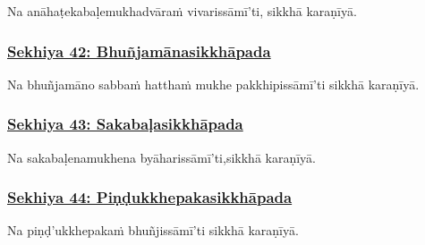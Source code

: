 Na anāhaṭe\makeatletter\hyperlink{endnote494-appendix}\makeatother \thinspace kabaḷe\makeatletter\hyperlink{endnote495-appendix}\makeatother \thinspace mukhadvāraṁ vivarissāmī'ti, sikkhā karaṇīyā.



\subsubsection*{\hyperref[training42]{Sekhiya 42: Bhuñjamānasikkhāpada}}
\label{sekh42}

Na bhuñjamāno sabbaṁ hatthaṁ mukhe pakkhipissāmī'ti sikkhā karaṇīyā.



\subsubsection*{\hyperref[training43]{Sekhiya 43: Sakabaḷasikkhāpada}}
\label{sekh43}

Na sakabaḷena\makeatletter\hyperlink{endnote496-appendix}\makeatother \thinspace mukhena byāharissāmī'ti,\makeatletter\hyperlink{endnote497-appendix}\makeatother \thinspace sikkhā karaṇīyā.



\subsubsection*{\hyperref[training44]{Sekhiya 44: Piṇḍukkhepakasikkhāpada}}
\label{sekh44}

Na piṇḍ'ukkhepakaṁ bhuñjissāmī'ti sikkhā karaṇīyā.



